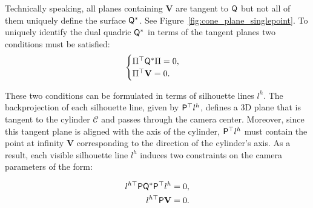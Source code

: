 Technically speaking, all planes containing $\mathbf{V}$ are tangent to $\mathsf{Q}$ but not all of them uniquely define the surface $\mathsf{Q}^*$. See Figure~\ref{fig:cone_plane_singlepoint}.
To uniquely identify the dual quadric $\mathsf{Q}^*$ in terms of the tangent planes two conditions must be satisfied:
\begin{equation}
	\begin{cases}
		\Pi^\top \mathsf{Q}^* \Pi = 0, \\
		\Pi^\top \mathbf{V} = 0.
	\end{cases}
\end{equation}

These two conditions can be formulated in terms of silhouette lines $l^h$. The backprojection of each silhouette line, given by $\mathsf{P}^\top l^h$, defines a 3D plane that is tangent to the cylinder $\mathcal{C}$ and passes through the camera center. Moreover, since this tangent plane is  aligned with the axis of the cylinder, $\mathsf{P}^\top l^h$ must contain the point at infinity $\mathbf{V}$ corresponding to the direction of the cylinder's axis. 
As a result, each visible silhouette line $l^h$ induces two constraints on the camera parameters of the form:

\begin{align}
	l^{h \top} \mathsf{P} \mathsf{Q}^* \mathsf{P}^\top l^h & = 0, \label{eq:dual_quadric_constraint} \\
	l^{h \top} \mathsf{P} \mathbf{V}         & = 0.\label{eq:vertex_constraint}
\end{align}

